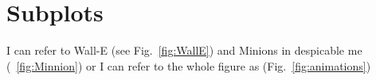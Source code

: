 \documentclass{report}
\begin{document}
\clearpage



\section*{Subplots}
I can refer to Wall-E (see Fig.~\ref{fig:WallE}) and Minions in despicable me (~\ref{fig:Minnion}) or I can refer to the whole figure as (Fig.~\ref{fig:animations})



\end{document}
